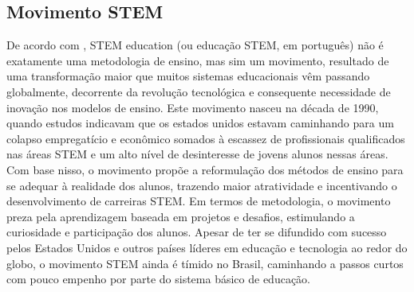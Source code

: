 \subsection{Movimento STEM}\label{sec:mov_stem}
De acordo com \cite{pugliese}, STEM education (ou educação STEM, em português) não é exatamente uma metodologia de ensino, mas sim um movimento, resultado de uma transformação maior que muitos sistemas educacionais vêm passando globalmente, decorrente da revolução tecnológica e consequente necessidade de inovação nos modelos de ensino. Este movimento nasceu na década de 1990, quando estudos indicavam que os estados unidos estavam caminhando para um colapso empregatício e econômico somados à escassez de profissionais qualificados nas áreas STEM e um alto nível de desinteresse de jovens alunos nessas áreas. Com base nisso, o movimento propõe a reformulação dos métodos de ensino para se adequar à realidade dos alunos, trazendo maior atratividade e incentivando o desenvolvimento de carreiras STEM. Em termos de metodologia, o movimento preza pela aprendizagem baseada em projetos e desafios, estimulando a curiosidade e participação dos alunos. Apesar de ter se difundido com sucesso pelos Estados Unidos e outros países líderes em educação e tecnologia ao redor do globo, o movimento STEM ainda é tímido no Brasil, caminhando a passos curtos com pouco empenho por parte do sistema básico de educação. 

